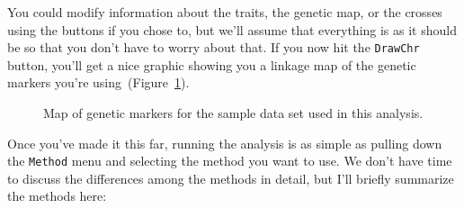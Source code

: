 You could modify information about the traits, the genetic map, or the
crosses using the buttons if you chose to, but we'll assume that
everything is as it should be so that you don't have to worry about
that. If you now hit the {\tt DrawChr} button, you'll get a nice
graphic showing you a linkage map of the genetic markers you're
using~(Figure~\ref{fig:qtl-marker-map}).

\begin{figure}
\begin{center}
\end{center}
\caption{Map of genetic markers for the sample data set used in this analysis.}\label{fig:qtl-marker-map}
\end{figure}

Once you've made it this far, running the analysis is as simple as
pulling down the {\tt Method} menu and selecting the method you want
to use. We don't have time to discuss the differences among the
methods in detail, but I'll briefly summarize the methods here:

